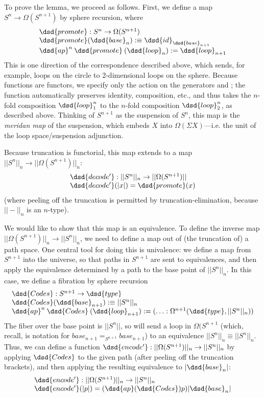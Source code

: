 To prove the lemma, we proceed as follows.  First, we define a map $S^n \to
\Omega(S^{n+1})$ by sphere recursion, where 
\[
\begin{array}{l}
\dsd{promote} : S^n \to \Omega(S^{n+1}) \\
\dsd{promote}(\dsd{base}_n) :\equiv \dsd{id}_{\dsd{base}_{n+1}} \\
\dsd{ap}^n \: \dsd{promote} \: (\dsd{loop}_n) := \dsd{loop}_{n+1}
\end{array}
\]
This is one direction of the correspondence described above, which
sends, for example, loops on the circle to 2-dimensional loops on the
sphere.  Because functions are functors, we specify only the action on
the generators  and ; the function automatically
preserves identity, composition, etc., and thus takes the $n$-fold
composition $\dsd{loop}_1^n$ to the $n$-fold composition
$\dsd{loop}_2^n$, as described above.  Thinking of $S^{n+1}$ as the
suspension of $S^n$, this map is the \emph{meridan map} of the
suspension, which embeds $X$ into $\Omega(\Sigma X)$---i.e. the unit of
the loop space/suspension adjunction.  

Because truncation is functorial, this map extends to a map $||S^n||_n
\to ||\Omega(S^{n+1})||_n$:
\[
\begin{array}{l}
\dsd{decode'} : ||S^n||_n \to ||\Omega(S^{n+1})|| \\
\dsd{decode'}(|x|) = \dsd{promote}(x)
\end{array}
\]
(where peeling off the truncation is permitted by
truncation-elimination, because $||-||_n$ is an $n$-type).

We would like to show that this map is an equivalence.  To define the
inverse map $||\Omega(S^{n+1})||_n \to ||S^n||_n$, we need to define a
map out of (the truncation of) a path space.  One central tool for doing
this is univalence: we define a map from $S^{n+1}$ into the universe, so
that paths in $S^{n+1}$ are sent to equivalences, and then apply the
equivalence determined by a path to the base point of $||S^n||_n$.  In
this case, we define a fibration  by sphere recursion
\[
\begin{array}{l}
\dsd{Codes} : S^{n+1} \to \dsd{type} \\
\dsd{Codes}(\dsd{base}_{n+1}) :\equiv ||S^{n}||_n \\
\dsd{ap}^n \: \dsd{Codes} \: (\dsd{loop}_{n+1}) := (\ldots : \Omega^{n+1}(\dsd{type},||S^{n}||_n)) \\
\end{array}
\]
The fiber over the base point is $||S^{n}||$, so  will send a
loop in $\Omega(S^{n+1}$ (which, recall, is notation for $base_{n+1}
=_{S^{n+1}} base_{n+1}$) to an equivalence $||S^{n}||_n \equiv
||S^{n}||_n$.  Thus, we can define a function $\dsd{encode'} : ||\Omega(S^{n+1})||_n \to
||S^n||_n$ by applying $\dsd{Codes}$ to the given path (after peeling
off the truncation brackets), and then
applying the resulting equivalence to $|\dsd{base}_n|$:
\[
\begin{array}{l}
\dsd{encode'} : ||\Omega(S^{n+1})||_n \to ||S^n||_n \\
\dsd{encode'}(|p|) = (\dsd{ap}(\dsd{Codes}) p) |\dsd{base}_n|
\end{array}
\]

